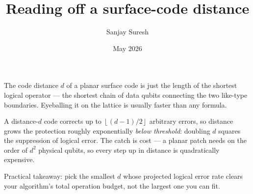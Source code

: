 \documentclass[11pt]{article}
\title{\textbf{Reading off a surface-code distance}}
\author{Sanjay Suresh}
\date{May 2026}
\begin{document}
\maketitle

The code distance $d$ of a planar surface code is just the length of the shortest logical
operator --- the shortest chain of data qubits connecting the two like-type boundaries. Eyeballing
it on the lattice is usually faster than any formula.

A distance-$d$ code corrects up to $\left\lfloor (d-1)/2 \right\rfloor$ arbitrary errors, so distance
grows the protection roughly exponentially \emph{below threshold}: doubling $d$ squares the
suppression of logical error. The catch is cost --- a planar patch needs on the order of $d^2$
physical qubits, so every step up in distance is quadratically expensive.

Practical takeaway: pick the smallest $d$ whose projected logical error rate clears your algorithm's
total operation budget, not the largest one you can fit.
\end{document}

